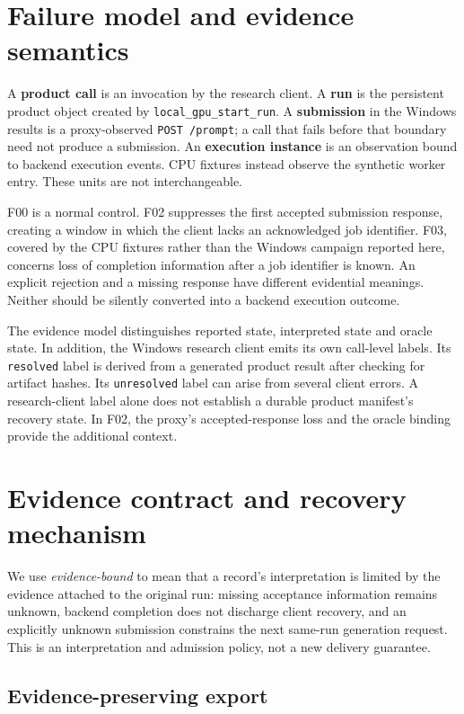 \documentclass{ieeeaccess}
\begin{document}
\section{Failure model and evidence semantics}

A \textbf{product call} is an invocation by the research client. A \textbf{run} is the
persistent product object created by \texttt{local\_gpu\_start\_run}. A \textbf{submission} in
the Windows results is a proxy-observed \texttt{POST /prompt}; a call that fails before
that boundary need not produce a submission. An \textbf{execution instance} is an
observation bound to backend execution events. CPU fixtures instead observe
the synthetic worker entry. These units are not interchangeable.

F00 is a normal control. F02 suppresses the first accepted submission response,
creating a window in which the client lacks an acknowledged job identifier.
F03, covered by the CPU fixtures rather than the Windows campaign reported
here, concerns loss of completion information after a job identifier is known.
An explicit rejection and a missing response have different evidential meanings.
Neither should be silently converted into a backend execution outcome.

The evidence model distinguishes reported state, interpreted state and oracle
state. In addition, the Windows research client emits its own call-level labels.
Its \texttt{resolved} label is derived from a generated product result after checking
for artifact hashes. Its \texttt{unresolved} label can arise from several client errors.
A research-client label alone does not establish a durable product
manifest's recovery state. In F02, the proxy's accepted-response
loss and the oracle binding provide the additional context.

\section{Evidence contract and recovery mechanism}

We use \emph{evidence-bound} to mean that a record's interpretation is limited
by the evidence attached to the original run: missing acceptance information
remains unknown, backend completion does not discharge client recovery, and an
explicitly unknown submission constrains the next same-run generation request.
This is an interpretation and admission policy, not a new delivery guarantee.

\subsection{Evidence-preserving export}
\end{document}
